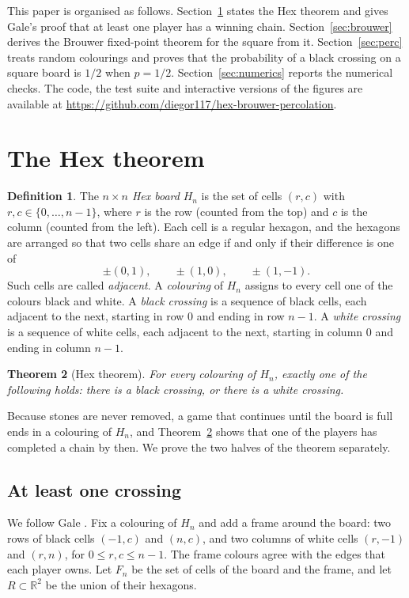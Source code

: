 \documentclass[11pt,a4paper]{amsart}
\newtheorem{theorem}{Theorem}[section]
\theoremstyle{definition}
\newtheorem{definition}[theorem]{Definition}
\theoremstyle{remark}
\newcommand{\R}{\mathbb{R}}
\newcommand{\repo}{\url{https://github.com/diegor117/hex-brouwer-percolation}}
\begin{document}
This paper is organised as follows. Section~\ref{sec:hex} states the Hex theorem and gives Gale's proof that at least one player has a winning chain. Section~\ref{sec:brouwer} derives the Brouwer fixed-point theorem for the square from it. Section~\ref{sec:perc} treats random colourings and proves that the probability of a black crossing on a square board is $1/2$ when $p = 1/2$. Section~\ref{sec:numerics} reports the numerical checks. The code, the test suite and interactive versions of the figures are available at \repo.

\section{The Hex theorem}\label{sec:hex}

\begin{definition}
The \emph{$n \times n$ Hex board} $H_n$ is the set of cells $(r,c)$ with $r, c \in \{0, \dots, n-1\}$, where $r$ is the row (counted from the top) and $c$ is the column (counted from the left). Each cell is a regular hexagon, and the hexagons are arranged so that two cells share an edge if and only if their difference is one of
\[
  \pm(0,1), \qquad \pm(1,0), \qquad \pm(1,-1).
\]
Such cells are called \emph{adjacent}. A \emph{colouring} of $H_n$ assigns to every cell one of the colours black and white. A \emph{black crossing} is a sequence of black cells, each adjacent to the next, starting in row $0$ and ending in row $n-1$. A \emph{white crossing} is a sequence of white cells, each adjacent to the next, starting in column $0$ and ending in column $n-1$.
\end{definition}

\begin{theorem}[Hex theorem]\label{thm:hex}
For every colouring of $H_n$, exactly one of the following holds: there is a black crossing, or there is a white crossing.
\end{theorem}

Because stones are never removed, a game that continues until the board is full ends in a colouring of $H_n$, and Theorem~\ref{thm:hex} shows that one of the players has completed a chain by then. We prove the two halves of the theorem separately.

\subsection{At least one crossing}

We follow Gale \cite{gale}. Fix a colouring of $H_n$ and add a frame around the board: two rows of black cells $(-1,c)$ and $(n,c)$, and two columns of white cells $(r,-1)$ and $(r,n)$, for $0 \le r, c \le n-1$. The frame colours agree with the edges that each player owns. Let $F_n$ be the set of cells of the board and the frame, and let $R \subset \R^2$ be the union of their hexagons.
\end{document}
